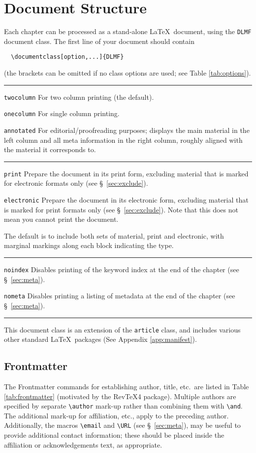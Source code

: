 \documentclass[twoside]{article}
\newcommand{\DLMF}{{\sc DLMF}}
\newcommand{\token}[1]{\texttt{#1}}
\newenvironment{Table}[1]{%
   \begin{table}[htb]\hrule\begin{centering}\caption{#1}}{%
   \par\end{centering}\hrule\end{table}}
\newenvironment{Description}{%
   \begingroup\def\arraystretch{1.3}\small\begin{description}}{%
   \end{description}\endgroup}
\begin{document}
\section{Document Structure}\label{sec:structure}
Each chapter can be processed as a stand-alone \LaTeX\ document, using
the \token{DLMF} document class.  The first line of your document should contain
\begin{verbatim}
  \documentclass[option,...]{DLMF}
\end{verbatim}
(the brackets can be omitted if no class options are used;
 see Table \ref{tab:options}).  
\begin{Table}{\DLMF\ Document class options.\label{tab:options}}
\begin{Description}
\item[\token{twocolumn}] For two column printing (the default). 
\item[\token{onecolumn}] For single column printing.
\item[\token{annotated}] For editorial/proofreading purposes;
  displays the main material in the left column and all meta information
  in the right column, roughly aligned with the material it corresponds to.
\hrule
\item[\token{print}] Prepare the document in its print form, excluding material
  that is marked for electronic formats only (see \S~\ref{sec:exclude}).
\item[\token{electronic}] Prepare the document in its electronic form, excluding
  material that is marked for print formats only (see \S~\ref{sec:exclude}).
  Note that this does not mean you cannot print the document.
\item The default is to include both sets of material, print and electronic,
  with marginal markings along each block indicating the type.
\hrule
\item[\token{noindex}] Disables printing of the keyword index at the end of 
  the chapter (see \S~\ref{sec:meta}).
\item[\token{nometa}] Disables printing a listing of metadata at the end of 
  the chapter (see \S~\ref{sec:meta}).
\end{Description}
\end{Table}

This document class is an extension of the \token{article} class, and includes
various other standard \LaTeX\ packages (See Appendix \ref{app:manifest}).

\subsection{Frontmatter}\label{sec:frontmatter}
The Frontmatter commands for establishing author, title, etc.~are listed
in Table \ref{tab:frontmatter} (motivated by the RevTeX4 package).
Multiple authors are specified by separate \verb|\author|
mark-up rather than combining them with \verb|\and|. The additional
mark-up for affiliation, etc., apply to the preceding author.
Additionally, the macros \verb|\email| and \verb|\URL| (see \S~\ref{sec:meta}),
may be useful to provide additional contact information; these should be placed
inside the affiliation or acknowledgements text, as appropriate.
\end{document}
